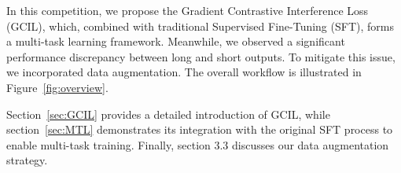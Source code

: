 \documentclass[11pt]{article}
\begin{document}

In this competition, we propose the Gradient Contrastive Interference Loss (GCIL), which, combined with traditional Supervised Fine-Tuning (SFT), forms a multi-task learning framework. Meanwhile, we observed a significant performance discrepancy between long and short outputs. To mitigate this issue, we incorporated data augmentation. The overall workflow is illustrated in Figure~\ref{fig:overview}.

Section~\ref{sec:GCIL} provides a detailed introduction of GCIL, while section~\ref{sec:MTL} demonstrates its integration with the original SFT process to enable multi-task training. Finally, section 3.3 discusses our data augmentation strategy.



\end{document}
